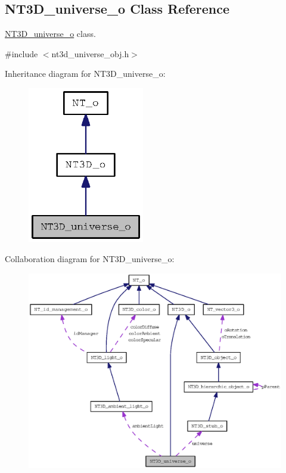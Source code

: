 \subsection{NT3D\_\-universe\_\-o Class Reference}
\label{class_n_t3_d__universe__o}


\hyperlink{class_n_t3_d__universe__o}{NT3D\_\-universe\_\-o} class.  




{\ttfamily \#include $<$nt3d\_\-universe\_\-obj.h$>$}



Inheritance diagram for NT3D\_\-universe\_\-o:
\nopagebreak
\begin{figure}[H]
\begin{center}
\leavevmode
\includegraphics[width=144pt]{class_n_t3_d__universe__o__inherit__graph}
\end{center}
\end{figure}


Collaboration diagram for NT3D\_\-universe\_\-o:
\nopagebreak
\begin{figure}[H]
\begin{center}
\leavevmode
\includegraphics[width=400pt]{class_n_t3_d__universe__o__coll__graph}
\end{center}
\end{figure}
